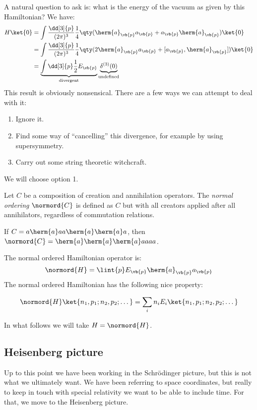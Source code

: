 \documentclass{jknotes} %
\begin{document}
A natural question to ask is: what is the energy of the vacuum as given by this Hamiltonian? We have:
\begin{align}
    H\ket{0} &= \int\frac{\dd[3]{p}}{(2\pi)^3}\frac{1}{4}\qty(\herm{a}_{\vb{p}}a_{\vb{p}} + a_{\vb{p}}\herm{a}_{\vb{p}}) \ket{0} \\
    &= \int\frac{\dd[3]{p}}{(2\pi)^3}\frac{1}{4}\qty(2\herm{a}_{\vb{p}}a_{\vb{p}} + [a_{\vb{p}},\herm{a}_{\vb{p}}]) \ket{0} \\
    &= \underbrace{\int\dd[3]{p}\frac{1}{2}E_{\vb{p}}}_\text{divergent} \underbrace{\delta^{(3)}(0)}_\text{undefined}
\end{align}
This result is obviously nonsensical. There are a few ways we can attempt to deal with it:
\begin{enumerate}
    \item Ignore it.
    \item Find some way of ``cancelling'' this divergence, for example by using supersymmetry.
    \item Carry out some string theoretic witchcraft.
\end{enumerate}
We will choose option 1. \disapprove
\begin{defn}
    Let \(C\) be a composition of creation and annihilation operators. The \emph{normal ordering} \(\normord{C}\) is defined as \(C\) but with all creators applied after all annihilators, regardless of commutation relations.
\end{defn}
\begin{eg}
    If \(C = a\herm{a}aa\herm{a}\herm{a}a\), then \(\normord{C} = \herm{a}\herm{a}\herm{a}aaaa\).
\end{eg}

The normal ordered Hamiltonian operator is:
\begin{equation}
    \normord{H} = \lint{p} E_{\vb{p}}\herm{a}_{\vb{p}}a_{\vb{p}}
\end{equation}
The normal ordered Hamiltonian has the following nice property:

\begin{equation}
    \normord{H}\ket{n_1,p_1;n_2,p_2;\dots} = \sum_in_iE_i\ket{n_1,p_1;n_2,p_2;\dots}
\end{equation}

In what follows we will take \(H = \normord{H}\).

\subsection{Heisenberg picture}
Up to this point we have been working in the Schr\"odinger picture, but this is not what we ultimately want. We have been referring to space coordinates, but really to keep in touch with special relativity we want to be able to include time. For that, we move to the Heisenberg picture.
\end{document}
